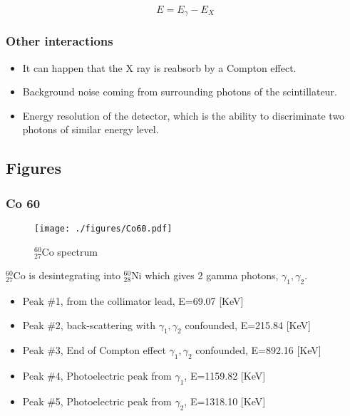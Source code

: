 \documentclass[a4paper,12pt,oneside]{article}
\begin{document}
$$E=E_{\gamma}-E_{X}$$

\subsubsection{Other interactions}
\begin{itemize}
\item It can happen that the X ray is reabsorb by a Compton effect.
\item Background noise coming from surrounding photons of the scintillateur.
\item Energy resolution of the detector, which is the ability to discriminate two photons of similar energy level.
\end{itemize}

\newpage
\subsection{Figures}
\begin{comment}
\subsubsection{Co 57}
\begin{figure}[h!]
	\begin{center}
	\texttt{[image: ./figures/Co57.pdf]}
	\caption{} \label{fig:Co57}
	\end{center}
\end{figure}


\newpage
\end{comment}
\subsubsection{Co 60}
\begin{figure}[h!]
	\begin{center}
	\texttt{[image: ./figures/Co60.pdf]}
	\caption{$_{27}^{60}$Co spectrum} \label{fig:Co60}
	\end{center}
\end{figure}

$_{27}^{60}$Co is desintegrating into $_{28}^{60}$Ni which gives 2 gamma photons, $\gamma_1,\gamma_2$.

\begin{itemize}
\item Peak \#1, from the collimator lead, E=69.07 [KeV]
\item Peak \#2, back-scattering with $\gamma_1,\gamma_2$ confounded, E=215.84 [KeV]
\item Peak \#3, End of Compton effect $\gamma_1,\gamma_2$ confounded, E=892.16 [KeV]
\item Peak \#4, Photoelectric peak from $\gamma_1$, E=1159.82 [KeV]
\item Peak \#5, Photoelectric peak from $\gamma_2$, E=1318.10 [KeV]
\end{itemize}
\end{document}
